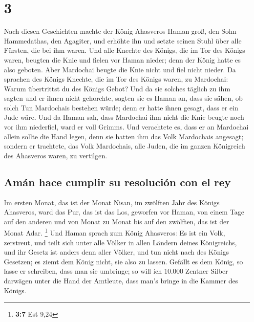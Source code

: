 \hypertarget{section-2}{%
\section{3}\label{section-2}}

 Nach diesen Geschichten machte der König Ahasveros Haman
groß, den Sohn Hammedathas, den Agagiter, und erhöhte ihn und setzte
seinen Stuhl über alle Fürsten, die bei ihm waren.  Und
alle Knechte des Königs, die im Tor des Königs waren, beugten die Knie
und fielen vor Haman nieder; denn der König hatte es also geboten. Aber
Mardochai beugte die Knie nicht und fiel nicht nieder.  Da
sprachen des Königs Knechte, die im Tor des Königs waren, zu Mardochai:
Warum übertrittst du des Königs Gebot?  Und da sie solches
täglich zu ihm sagten und er ihnen nicht gehorchte, sagten sie es Haman
an, dass sie sähen, ob solch Tun Mardochais bestehen würde; denn er
hatte ihnen gesagt, dass er ein Jude wäre.  Und da Haman
sah, dass Mardochai ihm nicht die Knie beugte noch vor ihm niederfiel,
ward er voll Grimms.  Und verachtete es, dass er an
Mardochai allein sollte die Hand legen, denn sie hatten ihm das Volk
Mardochais angesagt; sondern er trachtete, das Volk Mardochais, alle
Juden, die im ganzen Königreich des Ahasveros waren, zu vertilgen.

\hypertarget{amuxe1n-hace-cumplir-su-resoluciuxf3n-con-el-rey}{%
\subsection{Amán hace cumplir su resolución con el
rey}\label{amuxe1n-hace-cumplir-su-resoluciuxf3n-con-el-rey}}

 Im ersten Monat, das ist der Monat Nisan, im zwölften
Jahr des Königs Ahasveros, ward das Pur, das ist das Los, geworfen vor
Haman, von einem Tage auf den anderen und von Monat zu Monat bis auf den
zwölften, das ist der Monat Adar. \footnote{\textbf{3:7} Est 9,24}
 Und Haman sprach zum König Ahasveros: Es ist ein Volk,
zerstreut, und teilt sich unter alle Völker in allen Ländern deines
Königreichs, und ihr Gesetz ist anders denn aller Völker, und tun nicht
nach des Königs Gesetzen; es ziemt dem König nicht, sie also zu lassen.
 Gefällt es dem König, so lasse er schreiben, dass man sie
umbringe; so will ich 10.000 Zentner Silber darwägen unter die Hand der
Amtleute, dass man's bringe in die Kammer des Königs.

